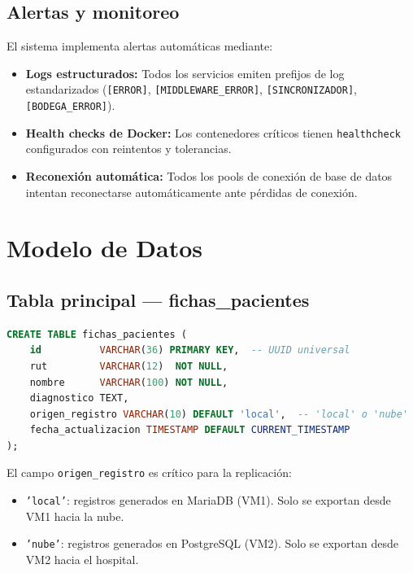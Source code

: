 \documentclass[11pt,a4paper]{article}
\begin{document}
\subsection{Alertas y monitoreo}

El sistema implementa alertas automáticas mediante:
\begin{itemize}
    \item \textbf{Logs estructurados:} Todos los servicios emiten prefijos de log
          estandarizados (\texttt{[ERROR]}, \texttt{[MIDDLEWARE\_ERROR]},
          \texttt{[SINCRONIZADOR]}, \texttt{[BODEGA\_ERROR]}).
    \item \textbf{Health checks de Docker:} Los contenedores críticos tienen
          \texttt{healthcheck} configurados con reintentos y tolerancias.
    \item \textbf{Reconexión automática:} Todos los pools de conexión de base de
          datos intentan reconectarse automáticamente ante pérdidas de conexión.
\end{itemize}

\section{Modelo de Datos}

\subsection{Tabla principal — fichas\_pacientes}

\begin{lstlisting}[language=SQL, caption=Definición de la tabla principal en MariaDB y PostgreSQL]
CREATE TABLE fichas_pacientes (
    id          VARCHAR(36) PRIMARY KEY,  -- UUID universal
    rut         VARCHAR(12)  NOT NULL,
    nombre      VARCHAR(100) NOT NULL,
    diagnostico TEXT,
    origen_registro VARCHAR(10) DEFAULT 'local',  -- 'local' o 'nube'
    fecha_actualizacion TIMESTAMP DEFAULT CURRENT_TIMESTAMP
);
\end{lstlisting}

El campo \texttt{origen\_registro} es crítico para la replicación:
\begin{itemize}
    \item \texttt{'local'}: registros generados en MariaDB (VM1). Solo se exportan
          desde VM1 hacia la nube.
    \item \texttt{'nube'}: registros generados en PostgreSQL (VM2). Solo se exportan
          desde VM2 hacia el hospital.
\end{itemize}
\end{document}
